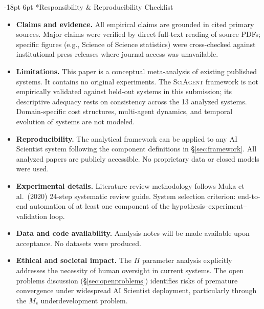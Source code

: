 \documentclass[11pt]{article}
\makeatletter
\renewcommand\section{\@startsection{section}{1}{\z@}%
  {-18pt \@plus -4pt \@minus -2pt}%
  {6pt \@plus 2pt}%
  {\normalfont\large\bfseries}}
\newcommand{\framework}{\textsc{SciAgent}}
\makeatother
\begin{document}
\section*{Responsibility \& Reproducibility Checklist}
\label{sec:repro-checklist}

\begin{itemize}
  \item \textbf{Claims and evidence.} All empirical claims are grounded in cited primary sources. Major claims were verified by direct full-text reading of source PDFs; specific figures (e.g., Science of Science statistics) were cross-checked against institutional press releases where journal access was unavailable.

  \item \textbf{Limitations.} This paper is a conceptual meta-analysis of existing published systems. It contains no original experiments. The \framework{} framework is not empirically validated against held-out systems in this submission; its descriptive adequacy rests on consistency across the 13 analyzed systems. Domain-specific cost structures, multi-agent dynamics, and temporal evolution of systems are not modeled.

  \item \textbf{Reproducibility.} The analytical framework can be applied to any AI Scientist system following the component definitions in \S\ref{sec:framework}. All analyzed papers are publicly accessible. No proprietary data or closed models were used.

  \item \textbf{Experimental details.} Literature review methodology follows Muka et al.\ (2020) 24-step systematic review guide. System selection criterion: end-to-end automation of at least one component of the hypothesis--experiment--validation loop.

  \item \textbf{Data and code availability.} Analysis notes will be made available upon acceptance. No datasets were produced.

  \item \textbf{Ethical and societal impact.} The $H$ parameter analysis explicitly addresses the necessity of human oversight in current systems. The open problems discussion (\S\ref{sec:openproblems}) identifies risks of premature convergence under widespread AI Scientist deployment, particularly through the $M_s$ underdevelopment problem.
\end{itemize}
\end{document}
